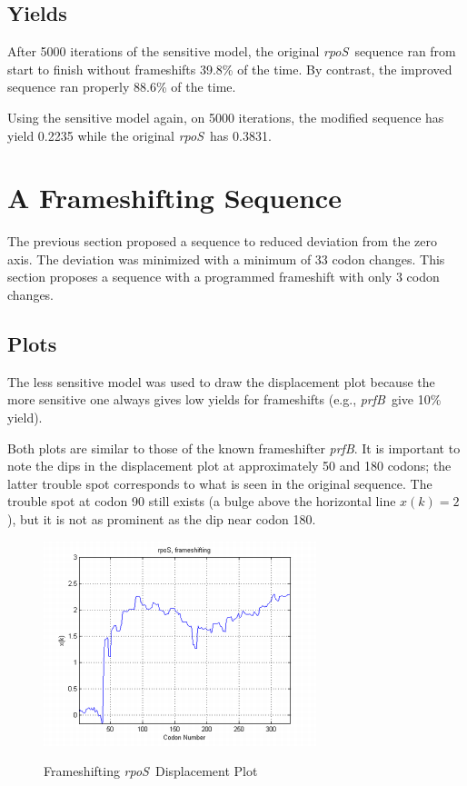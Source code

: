\documentclass[10pt,twocolumn]{article}
\newcommand{\prfB}{\emph{prfB}}
\newcommand{\rpoS}{\emph{rpoS}}
\begin{document}
\subsection{Yields}

After 5000 iterations of the sensitive model, the original \rpoS\ sequence ran from start to finish without frameshifts 39.8\% of the time.
By contrast, the improved sequence ran properly 88.6\% of the time.

Using the sensitive model again, on 5000 iterations, the modified sequence has yield 0.2235 while the original \rpoS\ has 0.3831.

\section{A Frameshifting Sequence}

The previous section proposed a sequence to reduced deviation from the zero axis.  
The deviation was minimized with a minimum of 33 codon changes.
This section proposes a sequence with a programmed frameshift with only 3 codon changes.

\subsection{Plots}

The less sensitive model was used to draw the displacement plot because the more sensitive one always gives low yields for frameshifts (e.g., \prfB\ give 10\% yield).

Both plots are similar to those of the known frameshifter \prfB.
It is important to note the dips in the displacement plot at approximately 50 and 180 codons; the latter trouble spot corresponds to what is seen in the original sequence.
The trouble spot at codon 90 still exists (a bulge above the horizontal line $x(k)=2$), but it is not as prominent as the dip near codon 180.

\begin{figure}[htp]
    \centering
    \caption{Frameshifting \rpoS\ Displacement Plot}
    \label{rposfs:disp}
    {\includegraphics[scale=1]{rpoSfs.png}}
\end{figure}
\end{document}

